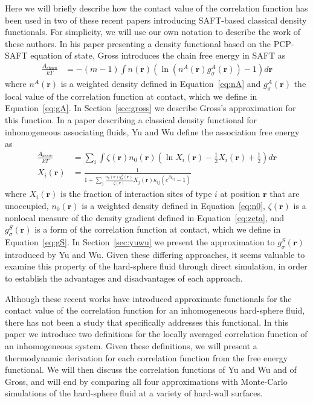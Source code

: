 \documentclass[letterpaper,twocolumn,amsmath,amssymb,pre]{revtex4-1}
\newcommand{\rr}{\textbf{r}}
\begin{document}
Here we will briefly describe how the contact value of the correlation
function has been used in two of these recent papers introducing SAFT-based
classical density functionals.  For simplicity, we
will use our own notation to describe the work of these authors.  In
his paper presenting a density functional based on the PCP-SAFT
equation of state\cite{gross2009density}, Gross introduces the chain
free energy in SAFT as
\begin{align}
  \frac{A_\textit{chain}}{kT} &= -(m-1) \int n(\rr) \left(\ln\left(n^A(\rr)
  g_\sigma^A(\rr) \right)-1\right) d\rr \label{eq:Achain}
\end{align}
where $n^A(\rr)$ is a weighted density defined in Equation~\ref{eq:nA}
and $g_\sigma^A(\rr)$ the local value of the correlation function at
contact, which we define in Equation~\ref{eq:gA}.  In
Section~\ref{sec:gross} we describe Gross's approximation for this
function. In a paper describing a classical
density functional for inhomogeneous associating
fluids\cite{yu2002fmt-dft-inhomogeneous-associating}, Yu and Wu define
the association free energy as
\begin{align}
  \frac{A_\textit{assoc}}{kT} &= \sum_i \int \zeta(\rr)n_0(\rr) \left(\ln X_i(\rr) - \frac12
  X_i(\rr) + \frac12\right) d\rr \label{eq:Aassoc} \\
  X_i(\rr) &= \frac{1}{1 + \sum_j \frac{n_0(\rr) g_\sigma^{S}(\rr)}{\zeta(\rr)}
                                 X_j(\rr)\kappa_{ij} \left(e^{\beta
                                   \epsilon_{ij}}-1\right)}
  \label{eq:X}
\end{align}
where $X_i(\rr)$ is the fraction of interaction sites of type $i$ at
position $\rr$ that are unoccupied, $n_0(\rr)$ is a weighted density
defined in Equation~\ref{eq:n0}, $\zeta(\rr)$ is a nonlocal measure of
the density gradient defined in Equation~\ref{eq:zeta}, and
$g_\sigma^S(\rr)$ is a form of the correlation
function at contact, which we define in Equation~\ref{eq:gS}.  In
Section~\ref{sec:yuwu} we present the approximation to
$g_\sigma^S(\rr)$ introduced by Yu and Wu.
Given these differing approaches, it seems valuable to examine this
property of the hard-sphere fluid through direct simulation, in order
to establish the advantages and disadvantages of each approach.

Although these recent works have introduced approximate functionals
for the contact value of the correlation function for an inhomogeneous
hard-sphere fluid\cite{yu2002fmt-dft-inhomogeneous-associating,
  gross2009density}, there has not been a study that specifically
addresses this functional.
%
In this paper we introduce two definitions for the locally averaged
correlation function of an inhomogeneous system.
%
%
Given these definitions, we will present a thermodynamic derivation
for each correlation function from the free energy functional.  We
will then discuss the correlation functions of Yu and Wu and of Gross, and
will end by comparing all four approximations with Monte-Carlo
simulations of the hard-sphere fluid at a variety of hard-wall
surfaces.
\end{document}
